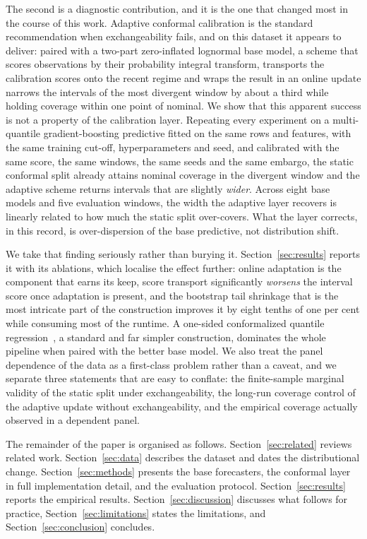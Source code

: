 \documentclass[preprint,3p,times]{elsarticle}
\begin{document}
The second is a diagnostic contribution, and it is the one that changed most in the course of this work. Adaptive conformal calibration is the standard recommendation when exchangeability fails, and on this dataset it appears to deliver: paired with a two-part zero-inflated lognormal base model, a scheme that scores observations by their probability integral transform, transports the calibration scores onto the recent regime and wraps the result in an online update narrows the intervals of the most divergent window by about a third while holding coverage within one point of nominal. We show that this apparent success is not a property of the calibration layer. Repeating every experiment on a multi-quantile gradient-boosting predictive fitted on the same rows and features, with the same training cut-off, hyperparameters and seed, and calibrated with the same score, the same windows, the same seeds and the same embargo, the static conformal split already attains nominal coverage in the divergent window and the adaptive scheme returns intervals that are slightly \emph{wider}. Across eight base models and five evaluation windows, the width the adaptive layer recovers is linearly related to how much the static split over-covers. What the layer corrects, in this record, is over-dispersion of the base predictive, not distribution shift.

We take that finding seriously rather than burying it. Section~\ref{sec:results} reports it with its ablations, which localise the effect further: online adaptation is the component that earns its keep, score transport significantly \emph{worsens} the interval score once adaptation is present, and the bootstrap tail shrinkage that is the most intricate part of the construction improves it by eight tenths of one per cent while consuming most of the runtime. A one-sided conformalized quantile regression~\cite{romano2019}, a standard and far simpler construction, dominates the whole pipeline when paired with the better base model. We also treat the panel dependence of the data as a first-class problem rather than a caveat, and we separate three statements that are easy to conflate: the finite-sample marginal validity of the static split under exchangeability, the long-run coverage control of the adaptive update without exchangeability, and the empirical coverage actually observed in a dependent panel.

The remainder of the paper is organised as follows. Section~\ref{sec:related} reviews related work. Section~\ref{sec:data} describes the dataset and dates the distributional change. Section~\ref{sec:methods} presents the base forecasters, the conformal layer in full implementation detail, and the evaluation protocol. Section~\ref{sec:results} reports the empirical results. Section~\ref{sec:discussion} discusses what follows for practice, Section~\ref{sec:limitations} states the limitations, and Section~\ref{sec:conclusion} concludes.
\end{document}
